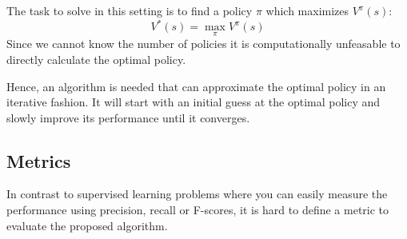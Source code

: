 \documentclass[a4paper,10pt]{article}
\begin{document}
The task to solve in this setting is to find a policy $\pi$ which maximizes $V^\pi(s)$:
\[V^*(s) = \max_\pi V^\pi(s)\]
Since we cannot know the number of policies it is computationally unfeasable to directly calculate the optimal policy.

Hence, an algorithm is needed that can approximate the optimal policy in an iterative fashion.
It will start with an initial guess at the optimal policy and slowly improve its performance until it converges.





\subsection{Metrics}

In contrast to supervised learning problems where you can easily measure the performance using precision, recall or F-scores, it is hard to define a metric to evaluate the proposed algorithm.
\end{document}
